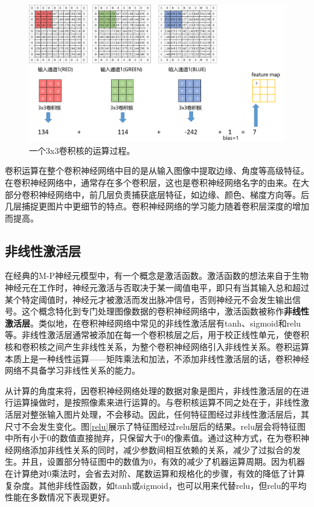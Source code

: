 \begin{figure}[ht]
	\centering
	\includegraphics[width=1\textwidth]{figures/convOPS.png}
	\caption{一个3x3卷积核的运算过程。}
	\label{convOPS}
\end{figure}

卷积运算在整个卷积神经网络中目的是从输入图像中提取边缘、角度等高级特征。在卷积神经网络中，通常存在多个卷积层，这也是卷积神经网络名字的由来。在大部分卷积神经网络中，前几层负责捕获底层特征，如边缘、颜色、梯度方向等。后几层捕捉更图片中更细节的特点。卷积神经网络的学习能力随着卷积层深度的增加而提高。

\subsection{非线性激活层}
在经典的M-P神经元模型中，有一个概念是激活函数。激活函数的想法来自于生物神经元在工作时，神经元激活与否取决于某一阈值电平，即只有当其输入总和超过某个特定阈值时，神经元才被激活而发出脉冲信号，否则神经元不会发生输出信号。这个概念特化到专门处理图像数据的卷积神经网络中，激活函数被称作\textbf{非线性激活层}。类似地，在卷积神经网络中常见的非线性激活层有tanh、sigmoid和relu等。非线性激活层通常被添加在每一个卷积核层之后，用于校正线性单元，使卷积核和卷积核之间产生非线性关系，为整个卷积神经网络引入非线性关系。卷积运算本质上是一种线性运算——矩阵乘法和加法，不添加非线性激活层的话，卷积神经网络不具备学习非线性关系的能力。

从计算的角度来将，因卷积神经网络处理的数据对象是图片，非线性激活层的在进行运算操做时，是按照像素来进行运算的。与卷积核运算不同之处在于，非线性激活层对整张输入图片处理，不会移动。因此，任何特征图经过非线性激活层后，其尺寸不会发生变化。图\ref{relu}展示了特征图经过relu层后的结果。relu层会将特征图中所有小于0的数值直接抛弃，只保留大于0的像素值。通过这种方式，在为卷积神经网络添加非线性关系的同时，减少参数间相互依赖的关系，减少了过拟合的发生。并且，设置部分特征图中的数值为0，有效的减少了机器运算周期。因为机器在计算绝对0乘法时，会省去对阶、尾数运算和规格化的步骤，有效的降低了计算复杂度。其他非线性函数，如tanh或sigmoid，也可以用来代替relu，但relu的平均性能在多数情况下表现更好。


